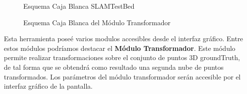 \begin{figure}[H]
\begin{center}
\hspace{0.5cm}
\end{center}
\caption{Esquema Caja Blanca SLAMTestBed }
\end{figure}


\begin{figure}[H]
\begin{center}
\hspace{0.5cm}
\end{center}
\caption{Esquema Caja Blanca del Módulo Transformador }
\end{figure}

Esta herramienta poseé varios modulos accesibles desde el interfaz gráfico. Entre estos módulos podríamos destacar el \textbf{Módulo Transformador}.
Este módulo permite realizar transformaciones sobre el conjunto de puntos 3D groundTruth, de tal forma que se obtendrá como resultado una segunda nube de puntos transformados.
Los parámetros del módulo transformador serán accesible por el interfaz gráfico de la pantalla.



